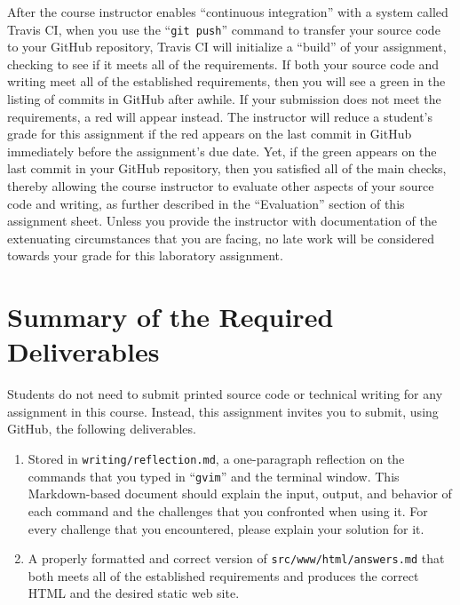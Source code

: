 \documentclass[11pt]{article}
\newcommand{\mainprogramsource}{\lstinline{src/www/html/answers.md}}
\newcommand{\reflection}{\lstinline{writing/reflection.md}}
\newcommand{\gitpush}{\command{git push}}
\newcommand{\command}[1]{``\lstinline{#1}''}
\newcommand{\step}[1]{``{#1}''}
\newcommand{\checkmark}{\ding{51}}
\newcommand{\naughtmark}{\ding{55}}
\begin{document}
After the course instructor enables \step{continuous integration} with a system
called Travis CI, when you use the \gitpush{} command to transfer your source
code to your GitHub repository, Travis CI will initialize a \step{build} of your
assignment, checking to see if it meets all of the requirements. If both your
source code and writing meet all of the established requirements, then you will
see a green \checkmark{} in the listing of commits in GitHub after awhile. If
your submission does not meet the requirements, a red \naughtmark{} will appear
instead. The instructor will reduce a student's grade for this assignment if the
red \naughtmark{} appears on the last commit in GitHub immediately before the
assignment's due date. Yet, if the green \checkmark{} appears on the last commit
in your GitHub repository, then you satisfied all of the main checks, thereby
allowing the course instructor to evaluate other aspects of your source code and
writing, as further described in the \step{Evaluation} section of this
assignment sheet. Unless you provide the instructor with documentation of the
extenuating circumstances that you are facing, no late work will be considered
towards your grade for this laboratory assignment.

\section*{Summary of the Required Deliverables}

\noindent Students do not need to submit printed source code or technical writing for any assignment in this course.
Instead, this assignment invites you to submit, using GitHub, the following deliverables.

\begin{enumerate}

\setlength{\itemsep}{0in}

\item Stored in \reflection{}, a one-paragraph reflection on the commands that you typed in \command{gvim} and the
  terminal window. This Markdown-based document should explain the input, output, and behavior of each command and the
  challenges that you confronted when using it. For every challenge that you encountered, please explain your solution
  for it.

\item A properly formatted and correct version of \mainprogramsource{} that both meets all of the established
  requirements and produces the correct HTML and the desired static web site.

\end{enumerate}
\end{document}
